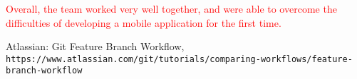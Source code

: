 \documentclass{article}
\begin{document}
\textcolor{red}{Overall, the team worked very well together, and were able to overcome the difficulties of developing a mobile application for the first time.}

\begin{thebibliography}{9}
Atlassian: Git Feature Branch Workflow,
\\\texttt{https://www.atlassian.com/git/tutorials/comparing-workflows/feature-branch-workflow}
\end{thebibliography}
\end{document}
